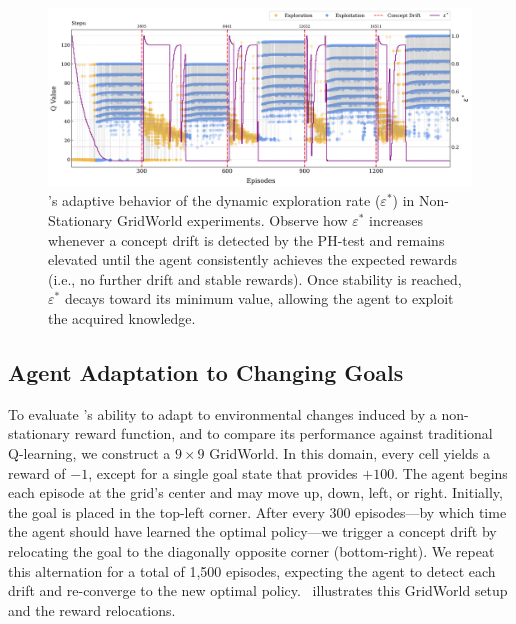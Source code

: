\begin{figure}
    \centering
    \includegraphics[width=\textwidth]{figures/eps}
    \caption{\adaptiverl's adaptive behavior of the dynamic exploration rate ($\varepsilon^*$) in Non-Stationary GridWorld experiments. Observe how $\varepsilon^*$ increases whenever a concept drift is detected by the PH-test and remains elevated until the agent consistently achieves the expected rewards (i.e., no further drift and stable rewards). Once stability is reached, $\varepsilon^*$ decays toward its minimum value, allowing the agent to exploit the acquired knowledge.}
    \label{fig:dynamic-eps}
\end{figure}

\subsection{Agent Adaptation to Changing Goals}
\label{sec:experiments}

To evaluate \adaptiverl's ability to adapt to environmental changes induced by a non-stationary reward function, and to compare its performance against traditional Q-learning, we construct a $9\times 9$ GridWorld. In this domain, every cell yields a reward of $-1$, except for a single goal state that provides $+100$. The agent begins each episode at the grid's center and may move up, down, left, or right. Initially, the goal is placed in the top-left corner. After every 300 episodes---by which time the agent should have learned the optimal policy---we trigger a concept drift by relocating the goal to the diagonally opposite corner (bottom-right). We repeat this alternation for a total of 1,500 episodes, expecting the agent to detect each drift and re-converge to the new optimal policy.~ illustrates this GridWorld setup and the reward relocations.

